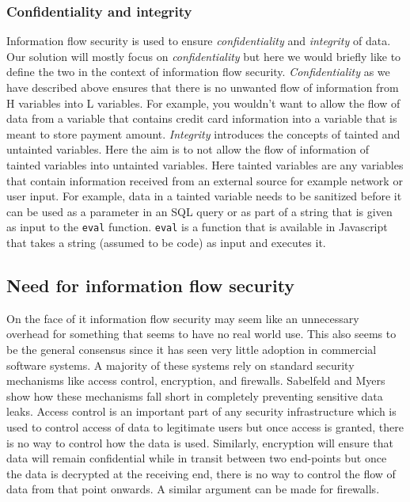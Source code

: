\subsubsection{Confidentiality and integrity}
Information flow security is used to ensure \textit{confidentiality} and \textit{integrity}
of data. Our solution will mostly focus on \textit{confidentiality} but here we would
briefly like to define the two in the context of information flow security. \textit{Confidentiality}
as we have described above ensures that there is no unwanted flow of information
from H variables into L variables. For example, you wouldn't want to allow the
flow of data from a variable that contains credit card information into a variable
that is meant to store payment amount. \textit{Integrity} introduces the concepts of
tainted and untainted variables. Here the aim is to not allow the flow of information
of tainted variables into untainted variables. Here tainted variables are any
variables that contain information received from an external source for example
network or user input. For example, data in a tainted variable needs to be sanitized
before it can be used as a parameter in an SQL query or as part of a string that
is given as input to the \texttt{eval} function. \texttt{eval} is a function that
is available in Javascript that takes a string (assumed to be code) as input and
executes it.

\subsection{Need for information flow security}
On the face of it information flow security may seem like an unnecessary overhead
for something that seems to have no real world use. This also seems to be the general
consensus since it has seen very little adoption in commercial software systems.
A majority of these systems rely on standard security mechanisms like access control,
encryption, and firewalls. Sabelfeld and Myers~\cite{LangInfo} show how these mechanisms
fall short in completely preventing sensitive data leaks. Access control is an
important part of any security infrastructure which is used to control access of
data to legitimate users but once access is granted, there is no way to control
how the data is used. Similarly, encryption will ensure that data will remain
confidential while in transit between two end-points but once the data is decrypted
at the receiving end, there is no way to control the flow of data from that point
onwards. A similar argument can be made for firewalls.

